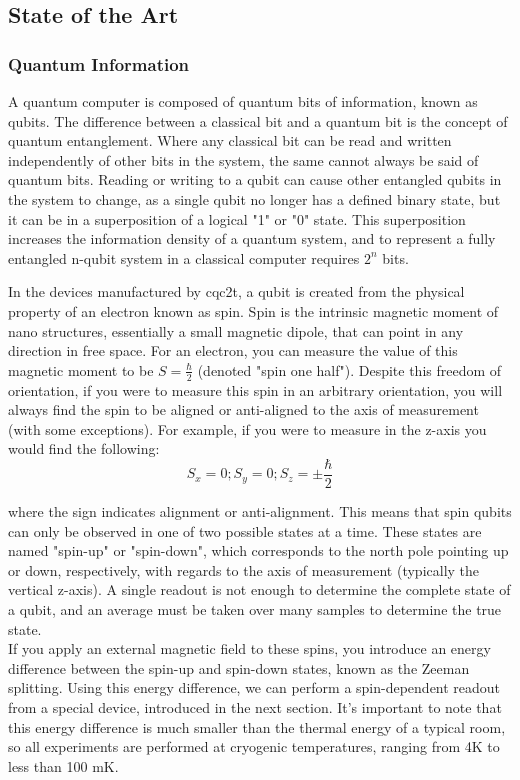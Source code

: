 \subsection{State of the Art}
\subsubsection{Quantum Information}
A quantum computer is composed of quantum bits of information, known as qubits. The difference between a classical bit and a quantum bit is the concept of quantum entanglement. Where any classical bit can be read and written independently of other bits in the system, the same cannot always be said of quantum bits. Reading or writing to a qubit can cause other entangled qubits in the system to change, as a single qubit no longer has a defined binary state, but it can be in a superposition of a logical "1" or "0" state. This superposition increases the information density of a quantum system, and to represent a fully entangled n-qubit system in a classical computer requires $2^n$ bits. \cite{bennett2000quantum}

In the devices manufactured by \gls{cqc2t}, a qubit is created from the physical property of an electron known as spin. Spin is the intrinsic magnetic moment of nano structures, essentially a small magnetic dipole, that can point in any direction in free space. For an electron, you can measure the value of this magnetic moment to be $S = \frac{\hbar}{2}$ (denoted "spin one half"). Despite this freedom of orientation, if you were to measure this spin in an arbitrary orientation, you will always find the spin to be aligned or anti-aligned to the axis of measurement (with some exceptions). For example, if you were to measure in the z-axis you would find the following:
$$S_x = 0; S_y = 0; S_z = \pm\frac{\hbar}{2}$$

where the sign indicates alignment or anti-alignment.
This means that spin qubits can only be observed in one of two possible states at a time. These states are named "spin-up" or "spin-down", which corresponds to the north pole pointing up or down, respectively, with regards to the axis of measurement (typically the vertical z-axis). A single readout is not enough to determine the complete state of a qubit, and an average must be taken over many samples to determine the true state. \\
\label{zeeman}
If you apply an external magnetic field to these spins, you introduce an energy difference between the spin-up and spin-down states, known as the Zeeman splitting. Using this energy difference, we can perform a spin-dependent readout from a special device, introduced in the next section. It's important to note that this energy difference is much smaller than the thermal energy of a typical room, so all experiments are performed at cryogenic temperatures, ranging from 4K to less than 100 mK. \cite{morello2010single}
